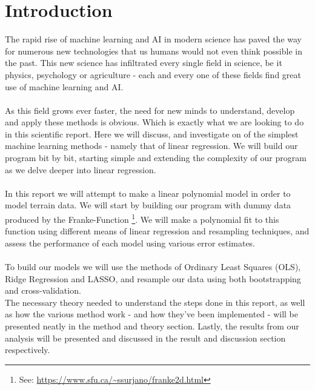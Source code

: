 \documentclass[../main.tex]{subfiles}
\begin{document}
\section{Introduction}
The rapid rise of machine learning and AI in modern science has paved the way for numerous new technologies that us humans would not even think possible in the past. This new science has infiltrated every single field in science, be it physics, psychology or agriculture - each and every one of these fields find great use of machine learning and AI. 
\\ \\ As this field grows ever faster, the need for new minds to understand, develop and apply these methods is obvious. Which is exactly what we are looking to do in this scientific report. Here we will discuss, and investigate on of the simplest machine learning methods - namely that of linear regression. We will build our program bit by bit, starting simple and extending the complexity of our program as we delve deeper into linear regression. 
 \\ \\ In this report we will attempt to make a linear polynomial model in order to model terrain data. We will start by building our program with dummy data produced by the Franke-Function \footnote{See: \url{https://www.sfu.ca/~ssurjano/franke2d.html}}. We will make a polynomial fit to this function using different means of linear regression and resampling techniques, and assess the performance of each model using various error estimates.
 \\\\
To build our models we will use the methods of Ordinary Least Squares (OLS), Ridge Regression and LASSO, and resample our data using both bootstrapping and cross-validation. \\ \indent The necessary theory needed to understand the steps done in this report, as well as how the various method work - and how they've been implemented - will be presented neatly in the method and theory section. Lastly, the results from our analysis will be presented and discussed in the result and discussion section respectively.
\end{document}
